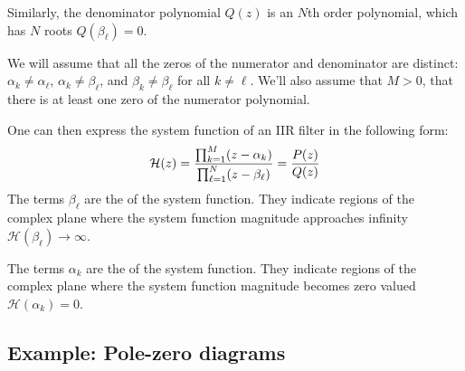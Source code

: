 Similarly, the denominator polynomial $Q(z)$ is an $N$th order
polynomial, which has $N$ roots $Q(\beta_{\ell})=0$.

We will assume that all the zeros of the numerator and denominator
are distinct: $\alpha_{k} \ne \alpha_{\ell}$,
$\alpha_{k} \ne \beta_{\ell}$, and $\beta_{k} \ne \beta_{\ell}$ for
all $k\ne \ell$. We'll also assume that $M>0$, that there is at least
one zero of the numerator polynomial.

One can then express the system function of an IIR filter in the
following form:
\begin{equation}
    \mathcal{H}(z) = \frac{\prod_{k=1}^{M}(z-\alpha_{k})}{\prod_{\ell=1}^{N}(z-\beta_{\ell} )} = \frac{P(z)}{Q(z)}
\end{equation}
The terms $\beta_{\ell}$ are the \emph{} of the
system function. They indicate regions of the complex plane where the
system function magnitude approaches infinity
$\mathcal{H}(\beta_{\ell})\rightarrow \infty$.

The terms $\alpha_{k}$ are the \emph{} of the
system function. They indicate regions of the complex plane where the
system function magnitude becomes zero valued $\mathcal{H}(\alpha_{k}) = 0$.

\subsection{Example: Pole-zero diagrams}


